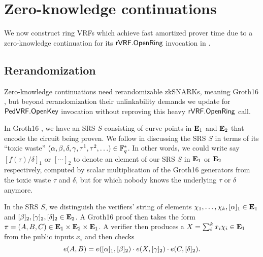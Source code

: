 
\section{Zero-knowledge continuations}
\label{sec:rvrf_cont}

We now construct ring VRFs which achieve fast amortized prover time
due to a zero-knowledge continuation for its ${\mathsf{rVRF}}.{\mathsf{OpenRing}}$
invocation in \Rring. 


\subsection{Rerandomization}

Zero-knowledge continuations need rerandomizable zkSNARKs,
meaning Groth16 \cite{Groth16}, but beyond rerandomization their
unlinkability demands we update \openpk for ${\mathsf{PedVRF}}.{\mathsf{OpenKey}}$
invocation without reproving this heavy ${\mathsf{rVRF}}.{\mathsf{OpenRing}}$ call.

In Groth16 \cite{Groth16}, we have an SRS $S$ consisting of curve
points in ${\mathbf{E}}_1$ and ${\mathbf{E}}_2$ that encode the circuit being proven.
We follow \cite{Groth16} in discussing the SRS $S$ in terms of
its ``toxic waste''
 $(\alpha,\beta,\delta,\gamma,\tau^1,\tau^2,\ldots) \in \mathbb{F}_q^*$.
In other words, we could write say $[ f(\tau)/\delta ]_1$ or $[\cdots]_2$
to denote an element of our SRS $S$ in ${\mathbf{E}}_1$ or ${\mathbf{E}}_2$ respectively,
computed by scalar multiplication of the Groth16 generators from
the toxic waste $\tau$ and $\delta$,
 but for which nobody knows the underlying $\tau$ or $\delta$ anymore.

In the SRS $S$, we distinguish the verifiers' string of elements
 $\chi_1,\ldots,\chi_k, [\alpha]_1 \in {\mathbf{E}}_1$ and
 $[\beta]_2, [\gamma]_2, [\delta]_2 \in {\mathbf{E}}_2$.
A Groth16 \cite{Groth16} proof then takes the form 
 $\pi = (A,B,C) \in {\mathbf{E}}_1 \times {\mathbf{E}}_2 \times {\mathbf{E}}_1$.
A verifier then produces a $X = \sum_i^k x_i \chi_i \in {\mathbf{E}}_1$ from
 the public inputs $x_i$ and then checks 
$$ e(A,B) = e([\alpha]_1, [\beta]_2) \cdot
 e(X, [\gamma]_2) \cdot e(C, [\delta]_2) . $$

